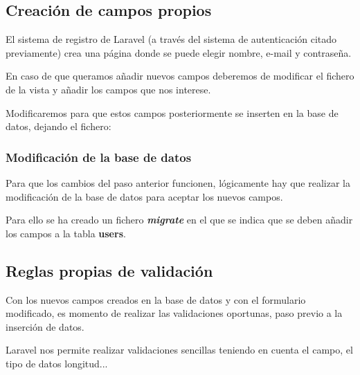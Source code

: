 \documentclass{\ClassPath/viu-tfm-template}
\begin{document}
\subsection{Creación de campos propios}
El sistema de registro de Laravel (a través del sistema de autenticación citado previamente) crea una página donde se puede elegir nombre, e-mail y contraseña.

En caso de que queramos añadir nuevos campos deberemos de modificar el fichero de la vista  y añadir los campos que nos interese.

Modificaremos  para que estos campos posteriormente se inserten en la base de datos, dejando el fichero:





\subsubsection{Modificación de la base de datos}
Para que los cambios del paso anterior funcionen, lógicamente hay que realizar la modificación de la base de datos para aceptar los nuevos campos.

Para ello se ha creado un fichero \textbf{\textit{migrate}} en el que se indica que se deben añadir los campos a la tabla \textbf{users}.


\subsection{Reglas propias de validación}
Con los nuevos campos creados en la base de datos y con el formulario modificado, es momento de realizar las validaciones oportunas, paso previo a la inserción de datos.

Laravel nos permite realizar validaciones sencillas teniendo en cuenta el campo, el tipo de datos longitud...
\end{document}
